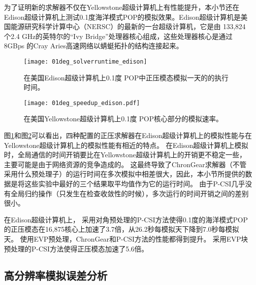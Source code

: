  
为了证明新的求解器不仅在Yellowstone超级计算机上有性能提升，本小节还在Edison超级计算机上测试0.1度海洋模式POP的模拟效果。Edison超级计算机是美国能源研究科学计算中心（NERSC）的最新的一台超级计算机，它是由 133,824 个2.4 GHz的英特尔的“Ivy Bridge”处理器核心组成，这些处理器核心是通过 8GBps 的Cray
Aries高速网络以蜻蜓拓扑的结构连接起来。  


\begin {figure}[!t]
\centering
\texttt{[image: 01deg\_solverruntime\_edison]}
\caption []{在美国Edison超级计算机上0.1度 POP中正压模态模拟一天的的执行时间。\label {fig:runtime01_edison_time}}
\end {figure}

\begin {figure}[!t]
\centering
\texttt{[image: 01deg\_speedup\_edison.pdf]}
\caption []{在美国Yellowstone超级计算机上0.1度 POP核心部分的模拟速率。\label {fig:runtime01_edison_rate}}
\end {figure}

图\ref{fig:runtime01_edison_time}和图\ref{fig:runtime01_edison_rate}可以看出，四种配置的正压求解器在Edison超级计算机上的模拟性能与在Yellowstone超级计算机上的模拟性能有相近的特点。 
在Edison超级计算机上模拟时，全局通信的时间开销要比在Yellowstone超级计算机上的开销更不稳定一些，主要可能是由于网络资源的竞争造成的\cite{wang2014}。 
这最终导致了ChronGear求解器（不管采用什么预处理子）的运行时间在多次模拟中相差很大，因此，本小节所提供的数据是将这些实验中最好的三个结果取平均值作为它的运行时间。 
由于P-CSI几乎没有全局归约操作（只发生在检查收敛性的时候），多次运行的时间开销之间的差别很小。 

 
在Edison超级计算机上， 采用对角预处理的P-CSI方法使得0.1度的海洋模式POP的正压模态在16,875核心上加速了3.7倍，从26.2秒每模拟天下降到7.0秒每模拟天。 
使用EVP预处理，ChronGear和P-CSI方法的性能都得到提升。 
采用EVP块预处理的P-CSI方法使得正压模态加速了5.6倍。 
 
\subsection{高分辨率模拟误差分析}
\label{precond:exp:error}


